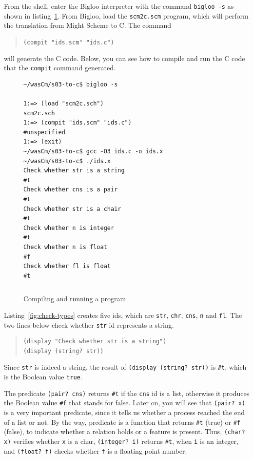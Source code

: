 \documentclass[a4paper,12pt]{book}
\newenvironment{fmpage}[1]
           {\begin{lrbox}{\fmbox}\begin{minipage}{#1}}
           {\end{minipage}\end{lrbox}\fbox{\usebox{\fmbox}}}
\begin{document}
From the shell, enter the Bigloo interpreter with
the command \verb|bigloo -s| as shown in
listing~\ref{fig:compile-and-run}. From
Bigloo, load the \verb|scm2c.scm| program, which
will perform the translation from Might Scheme
to C. The command
\begin{quote}
  \verb|(compit "ids.scm" "ids.c")|
\end{quote}
will generate the C code. Below, you can see how to
compile and run the C code that the \verb|compit|
command generated.
\begin{figure}[!h]
\begin{fmpage}{0.8\linewidth}
\begin{verbatim}
~/wasCm/s03-to-c$ bigloo -s

1:=> (load "scm2c.sch")
scm2c.sch
1:=> (compit "ids.scm" "ids.c")
#unspecified
1:=> (exit)
~/wasCm/s03-to-c$ gcc -O3 ids.c -o ids.x
~/wasCm/s03-to-c$ ./ids.x 
Check whether str is a string
#t
Check whether cns is a pair
#t
Check whether str is a chair
#t
Check whether n is integer
#t
Check whether n is float
#f
Check whether fl is float
#t
\end{verbatim}
\end{fmpage}

\begin{fmpage}{0.8\linewidth}
\begin{verbatim}

\end{verbatim}
\end{fmpage}
\caption{Compiling and running a program}
\label{fig:compile-and-run}
\end{figure}

Listing~\ref{fig:check-types} creates five
ids, which are \verb|str|, \verb|chr|,
\verb|cns|, \verb|n| and \verb|fl|. The
two lines below check whether \verb|str| id
represents a string.
\begin{quote}
\begin{verbatim}
(display "Check whether str is a string")
(display (string? str))
\end{verbatim}
\end{quote}
Since \verb|str| is indeed a string, the
result of \verb|(display (string? str))|
is \verb|#t|, which is the Boolean value
\verb|true|.

The predicate \verb|(pair? cns)| returns
\verb|#t| if the \verb|cns| id is a list,
otherwise it produces the Boolean value
\verb|#f| that stands for false. Later on,
you will see that \verb|(pair? x)| is
a very important predicate, since it
tells us whether a process reached the end
of a list or not. By the way, predicate
is a function that returns \verb|#t| (true)
or \verb|#f| (false), to indicate whether
a relation holds or a feature is present.
Thus, \verb|(char? x)| verifies whether
\verb|x| is a char, \verb|(integer? i)|
returns \verb|#t|, when \verb|i| is an
integer, and \verb|(float? f)| checks
whether \verb|f| is a floating point
number.
\end{document}
